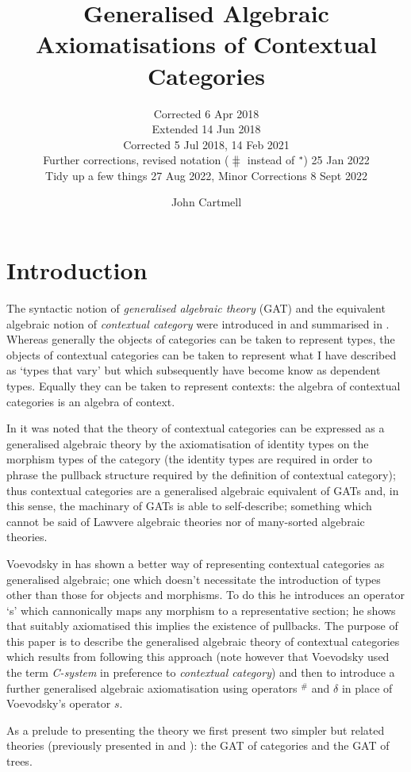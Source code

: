 \documentclass[10pt,a4paper]{scrartcl}
\title{Generalised Algebraic Axiomatisations of Contextual Categories}
\subtitle{Corrected 6 Apr 2018 \\
          Extended 14 Jun 2018 \\
		  Corrected 5 Jul 2018, 14 Feb 2021 \\
          Further corrections, revised notation ($\hash$ instead of $^*\kern-1pt$) 25 Jan 2022 \\
          Tidy up a few things 27 Aug 2022, Minor Corrections 8 Sept 2022}
\author{John Cartmell}
\date{}
\newcommand{\hash}{^\#}
\begin{document}
\maketitle


\section{Introduction}
The syntactic notion of \textit{generalised algebraic theory} (GAT) and the  equivalent algebraic notion of \textit{contextual category} were introduced in  \cite{Cartmell78} and summarised in \cite{Cartmell86}. Whereas generally the objects of categories can be taken to represent types, the objects of contextual categories can be taken to represent what I have described as `types that vary' but which subsequently have become know as dependent types. Equally they can be taken to represent contexts: the algebra of contextual categories is an algebra of context. 

In \cite{Cartmell78} it was noted that the theory of contextual categories can be expressed as a generalised algebraic theory by the axiomatisation of identity types on the morphism types of the category 
(the identity types are required in order to phrase the pullback structure required by the definition of contextual category); thus contextual categories are a generalised algebraic equivalent of GATs and, in this sense, the machinary of GATs is able to self-describe; something which cannot be said of Lawvere algebraic theories nor of many-sorted algebraic theories.  

 Voevodsky in \cite{Voevodsky14C} has shown a better way of representing contextual categories as generalised algebraic; one which doesn't necessitate the introduction of types other than those for objects and morphisms. To do this he introduces an operator `s' which cannonically maps any morphism to a representative section; he shows that suitably axiomatised this implies the existence of pullbacks.  The purpose of this paper is to describe the generalised algebraic theory
of contextual categories which results from following this approach (note however that Voevodsky used the term \textit{C-system} in preference to \textit{contextual category}) and then to introduce a further generalised algebraic axiomatisation using operators $\hash$ and $\delta$ in place of Voevodsky's operator $s$.   

As a prelude to presenting the theory we first present two simpler but related theories (previously presented in \cite{Cartmell78} and \cite{Cartmell86}): the GAT of categories and the GAT of trees.
\end{document}
